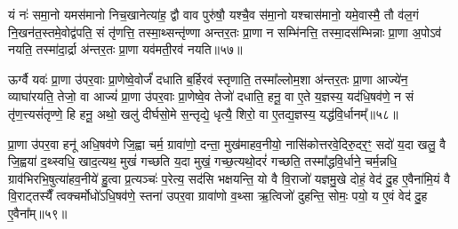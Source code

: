 यं नः॑ समा॒नो यमस॑मानो निच॒खानेत्या॑ह॒ द्वौ वाव पुरु॑षौ॒ यश्चै॒व स॑मा॒नो यश्चास॑मानो॒ यमे॒वास्मै॒ तौ व॑ल॒गं नि॒खन॑त॒स्तमे॒वोद्व॑पति॒ सं तृ॑णत्ति॒ तस्मा॒थ्सन्तृ॑ण्णा अन्तर॒तः प्रा॒णा न सम्भि॑नत्ति॒ तस्मा॒दस॑म्भिन्नाः प्रा॒णा अ॒पो\-ऽव॑ नयति॒ तस्मा॑दा॒र्द्रा अ॑न्तर॒तः प्रा॒णा यव॑मती॒रव॑ नयति॥५७॥

ऊर्ग्वै यवः॑ प्रा॒णा उ॑पर॒वाः प्रा॒णेष्वे॒वोर्जं॑ दधाति ब॒र्\mbox{}हिरव॑ स्तृणाति॒ तस्मा᳚ल्लोम॒शा अ॑न्तर॒तः प्रा॒णा आज्ये॑न॒ व्याघा॑रयति॒ तेजो॒ वा आज्यं॑ प्रा॒णा उ॑पर॒वाः प्रा॒णेष्वे॒व तेजो॑ दधाति॒ हनू॒ वा ए॒ते य॒ज्ञस्य॒ यद॑धि॒षव॑णे॒ न सं तृ॑ण॒त्त्यसं॑तृण्णे॒ हि हनू॒ अथो॒ खलु॑ दीर्घसो॒मे स॒न्तृद्ये॒ धृत्यै॒ शिरो॒ वा ए॒तद्य॒ज्ञस्य॒ यद्ध॑वि॒र्धानम्᳚॥५८॥

प्रा॒णा उ॑पर॒वा हनू॑ अधि॒षव॑णे जि॒ह्वा चर्म॒ ग्रावा॑णो॒ दन्ता॒ मुख॑माहव॒नीयो॒ नासि॑कोत्तरवे॒दिरु॒दर॒ꣳ॒ सदो॑ य॒दा खलु॒ वै जि॒ह्वया॑ द॒थ्स्वधि॒ खाद॒त्यथ॒ मुखं॑ गच्छति य॒दा मुखं॒ गच्छ॒त्यथो॒दरं॑ गच्छति॒ तस्मा᳚द्धवि॒र्धाने॒ चर्म॒न्नधि॒ ग्राव॑भिरभि॒षुत्या॑हव॒नीये॑ हु॒त्वा प्र॒त्यञ्चः॑ प॒रेत्य॒ सद॑सि भक्षयन्ति॒ यो वै वि॒राजो॑ यज्ञमु॒खे दोहं॒ वेद॑ दु॒ह ए॒वैना॑मि॒यं वै वि॒राट्तस्यैँ त्वक्चर्मोधो॑\-ऽधि॒षव॑णे॒ स्तना॑ उपर॒वा ग्रावा॑णो व॒थ्सा ऋ॒त्विजो॑ दुहन्ति॒ सोमः॒ पयो॒ य ए॒वं वेद॑ दु॒ह ए॒वैना᳚म्॥५९॥

{}%


{\anuvakamend[{चात्वा॑लाथ्सुव॒र्गाय॒ यद्वै॑सर्ज॒नानि॑ वैष्ण॒व्यर्चा पृ॑थि॒व्यै सा॒ध्या इ॒षे त्वेत्य॒ग्निना॒ पर्य॑ग्नि प॒शोः प॒शुमा॒लभ्य॒ मेद॑सा॒ स्रुचा॒वेका॑दश}]}%
